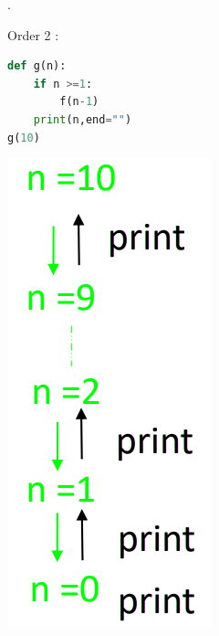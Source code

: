 \documentclass[12pt,oneside]{book}
\begin{document}
\begin{minipage}{0.2\linewidth}
	.
\end{minipage}
\begin{minipage}{0.3\linewidth}
	Order 2 :\\
\begin{lstlisting}[language=python]
def g(n):
	if n >=1:
		f(n-1)
	print(n,end="")
g(10)
\end{lstlisting}
\end{minipage}
\begin{minipage}{0.1\linewidth}
	\includegraphics[width=\linewidth]{../pic/python/6}
\end{minipage}
\end{document}

